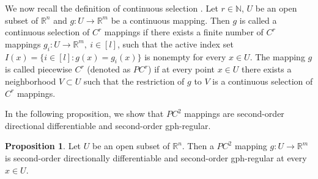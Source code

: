 \documentclass[11pt]{article}
\theoremstyle{definition}
\newtheorem{proposition}[theorem]{Proposition}
\theoremstyle{remark}
\numberwithin{equation}{section}
\begin{document}
We now recall the definition of continuous selection \cite[Page 3]{Kuntz 94}.
  Let $r\in \mathbb{N}$, $U$ be an open subset of $\mathbb{R}^n$ and  $g:U \to \mathbb{R}^m$ be a continuous mapping. Then $g$  is called a continuous selection of $C^r$ mappings if there exists a finite number of $C^r$ mappings $g_i:U \to \mathbb{R}^m,~ i\in[l]$, such that the active index set
$I(x)=\{i\in [l]:g(x)=g_i(x)\}$
is nonempty for every $x\in U$.
The mapping $g$ is called   piecewise $C^r$ (denoted as $PC^r$)  if at every point $x\in U$ there exists a neighborhood $V\subset U$ such that the restriction of $g$ to $V$ is a continuous selection of $C^r$ mappings.

 In the following proposition, we show that $PC^2$ mappings are second-order directional  differentiable and second-order  gph-regular.

\begin{proposition}\label{prop PC2}%
Let  $U$ be an open subset of $\mathbb{R}^n$. Then a $PC^2$ mapping $g: U\to \mathbb{R}^m$  is second-order
directionally differentiable
and second-order gph-regular at every $x\in U$.
\end{proposition}
\end{document}
